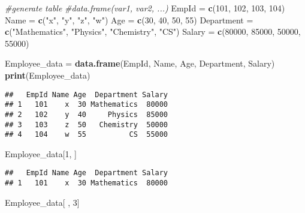 \documentclass[
]{article}
\newenvironment{Shaded}{\begin{snugshade}}{\end{snugshade}}
\newcommand{\CommentTok}[1]{\textcolor[rgb]{0.56,0.35,0.01}{\textit{#1}}}
\newcommand{\DecValTok}[1]{\textcolor[rgb]{0.00,0.00,0.81}{#1}}
\newcommand{\FunctionTok}[1]{\textcolor[rgb]{0.13,0.29,0.53}{\textbf{#1}}}
\newcommand{\NormalTok}[1]{#1}
\newcommand{\OtherTok}[1]{\textcolor[rgb]{0.56,0.35,0.01}{#1}}
\newcommand{\StringTok}[1]{\textcolor[rgb]{0.31,0.60,0.02}{#1}}
\begin{document}
\begin{Shaded}
\begin{Highlighting}[]
\CommentTok{\#generate table}
\CommentTok{\#data.frame(var1, var2, ...)}
\NormalTok{EmpId }\OtherTok{=} \FunctionTok{c}\NormalTok{(}\DecValTok{101}\NormalTok{, }\DecValTok{102}\NormalTok{, }\DecValTok{103}\NormalTok{, }\DecValTok{104}\NormalTok{)}
\NormalTok{Name }\OtherTok{=} \FunctionTok{c}\NormalTok{(}\StringTok{"x"}\NormalTok{, }\StringTok{"y"}\NormalTok{, }\StringTok{"z"}\NormalTok{, }\StringTok{"w"}\NormalTok{)}
\NormalTok{Age }\OtherTok{=} \FunctionTok{c}\NormalTok{(}\DecValTok{30}\NormalTok{, }\DecValTok{40}\NormalTok{, }\DecValTok{50}\NormalTok{, }\DecValTok{55}\NormalTok{)}
\NormalTok{Department }\OtherTok{=} \FunctionTok{c}\NormalTok{(}\StringTok{"Mathematics"}\NormalTok{, }\StringTok{"Physics"}\NormalTok{, }\StringTok{"Chemistry"}\NormalTok{, }\StringTok{"CS"}\NormalTok{)}
\NormalTok{Salary }\OtherTok{=} \FunctionTok{c}\NormalTok{(}\DecValTok{80000}\NormalTok{, }\DecValTok{85000}\NormalTok{, }\DecValTok{50000}\NormalTok{, }\DecValTok{55000}\NormalTok{)}

\NormalTok{Employee\_data }\OtherTok{=} \FunctionTok{data.frame}\NormalTok{(EmpId, Name, Age, Department, Salary)}
\FunctionTok{print}\NormalTok{(Employee\_data)}
\end{Highlighting}
\end{Shaded}

\begin{verbatim}
##   EmpId Name Age  Department Salary
## 1   101    x  30 Mathematics  80000
## 2   102    y  40     Physics  85000
## 3   103    z  50   Chemistry  50000
## 4   104    w  55          CS  55000
\end{verbatim}

\begin{Shaded}
\begin{Highlighting}[]
\NormalTok{Employee\_data[}\DecValTok{1}\NormalTok{, ]}
\end{Highlighting}
\end{Shaded}

\begin{verbatim}
##   EmpId Name Age  Department Salary
## 1   101    x  30 Mathematics  80000
\end{verbatim}

\begin{Shaded}
\begin{Highlighting}[]
\NormalTok{Employee\_data[ , }\DecValTok{3}\NormalTok{]}
\end{Highlighting}
\end{Shaded}
\end{document}
